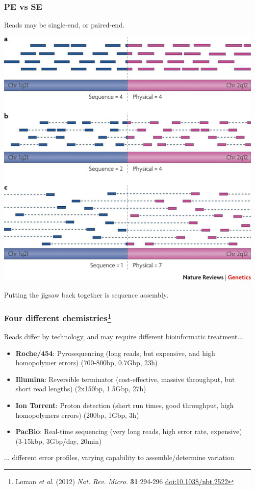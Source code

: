 \begin{frame}
  \frametitle{PE vs SE}
  Reads may be single-end, or paired-end.
  \begin{center}
    \includegraphics[height=0.6\textheight]{images/pe_vs_se}
  \end{center}      
  Putting the jigsaw back together is sequence assembly.
\end{frame}

\begin{frame}
  \frametitle{Four different chemistries\footnote{\tiny{Loman \textit{et al}. (2012) \textit{Nat. Rev. Micro.} \textbf{31}:294-296 \href{http://dx.doi.org/10.1038/nbt.2522}{doi:10.1038/nbt.2522}}}}
  Reads differ by technology, and may require different bioinformatic treatment$\ldots$
  \begin{itemize}
    \item \textbf{Roche/454}: Pyrosequencing (long reads, but expensive, and high homopolymer errors) (700-800bp, 0.7Gbp, 23h)
    \item \textbf{Illumina}: Reversible terminator (cost-effective, massive throughput, but short read lengths) (2x150bp, 1.5Gbp, 27h)
    \item \textbf{Ion Torrent}: Proton detection (short run times, good throughput, high homopolymers errors) (200bp, 1Gbp, 3h)
    \item \textbf{PacBio}: Real-time sequencing (very long reads, high error rate, expensive) (3-15kbp, 3Gbp/day, 20min)
  \end{itemize}
  $\ldots$ different error profiles, varying capability to assemble/determine variation
\end{frame}

